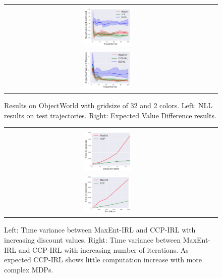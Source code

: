 \documentclass{article}
\def\MSHangBox#1{%
\begin{minipage}[t]{\textwidth}%
\begin{tabbing} %
~\\[-\baselineskip] %
#1 %
\end{tabbing}%
\end{minipage}} %
\begin{document}
\begin{figure}[t]
\centering
  \begin{tabular}{cc}
    \MSHangBox{\includegraphics[width=0.23\textwidth]{images/objectworld/grid_32_obj_30_algo_3/test_nll_algo_3.pdf}}
    \MSHangBox{\includegraphics[width=0.23\textwidth]{images/objectworld/grid_32_obj_30_algo_3_try_2/evd_num_algo_3.pdf}}
  \end{tabular}
    \caption{Results on ObjectWorld with gridsize of 32 and 2 colors. Left: NLL results on test trajectories. Right: Expected Value Difference results. }
    \label{fig:img_objectworld_maxent_vs_ccp_lr_01}
\end{figure}

\begin{figure}[t]
\centering
  \begin{tabular}{cc}
    \MSHangBox{\includegraphics[width=0.23\textwidth]{images/objectworld/timeit_maxent_vs_ccp_grid_32_discount_value.pdf}}
    \MSHangBox{\includegraphics[width=0.23\textwidth]{images/objectworld/timeit_maxent_vs_ccp_grid_16_per_iter.pdf}}
  \end{tabular}
    \caption{Left: Time variance between MaxEnt-IRL and CCP-IRL with increasing discount values. Right: Time variance between MaxEnt-IRL and CCP-IRL with increasing number of iterations. As expected CCP-IRL shows little computation increase with more complex MDPs.}
    \label{fig:img_objectworld_maxent_vs_ccp_time_results}
\end{figure}
\end{document}
